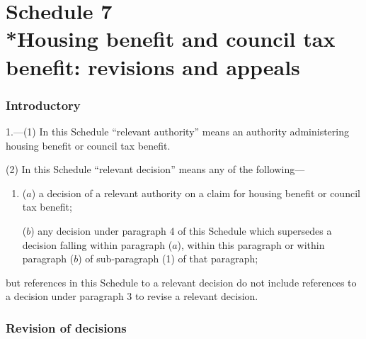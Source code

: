 \documentclass[12pt,a4paper]{article}
\begin{document}
%
%

\part[Schedule 7 --- Housing benefit and council tax benefit: revisions and appeals]{Schedule 7\\*Housing benefit and council tax benefit: revisions and appeals}

\renewcommand\parthead{--- Schedule 7}

\section*{Introductory}

1.---(1) In this Schedule “relevant authority” means an authority administering housing benefit or council tax benefit.

(2) In this Schedule “relevant decision” means any of the following—
\begin{enumerate}\item[]
($a$) a decision of a relevant authority on a claim for housing benefit or council tax benefit;

($b$) any decision under paragraph 4 of this Schedule which supersedes a decision falling within paragraph ($a$), within this paragraph or within paragraph ($b$)  of sub-paragraph (1)  of that paragraph;
\end{enumerate}
but references in this Schedule to a relevant decision do not include references to a decision under paragraph 3 to revise a relevant decision.
%
%
%


\section*{Revision of decisions}
\end{document}
